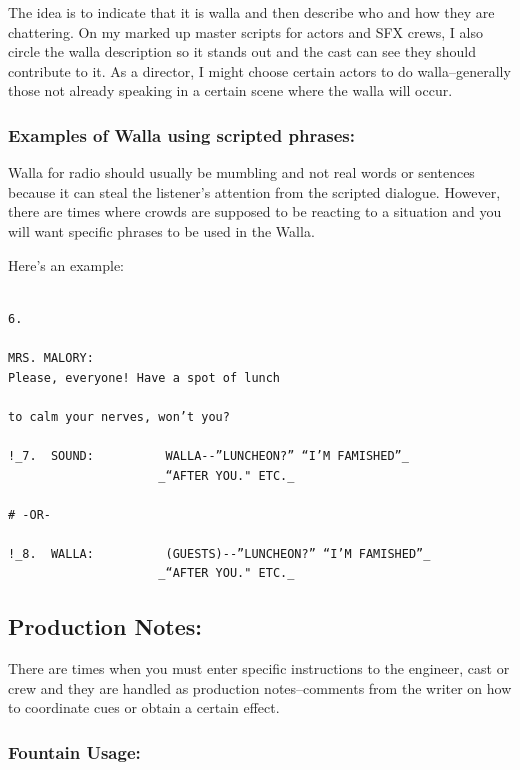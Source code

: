 \documentclass[openleft,oneside,showtrims]{memoir}
\begin{document}
The idea is to indicate that it is walla and then describe who and how they are chattering. On my marked up master scripts for actors and SFX crews, I also circle the walla description so it stands out and the cast can see they should contribute to it. As a director, I might choose certain actors to do walla--generally those not already speaking in a certain scene where the walla will occur.

\subsubsection*{Examples of Walla using scripted phrases:}
\label{sec:orgef529ac}

Walla for radio should usually be mumbling and not real words or sentences because it can steal the listener's attention from the scripted dialogue. However, there are times where crowds are supposed to be reacting to a situation and you will want specific phrases to be used in the Walla. 

Here's an example:

\lstset{language=fountain,label= ,caption= ,captionpos=b,numbers=none}
\begin{lstlisting}

6.

MRS. MALORY:
Please, everyone! Have a spot of lunch
  
to calm your nerves, won’t you?

!_7.  SOUND:          WALLA--”LUNCHEON?” “I’M FAMISHED”_
                     _“AFTER YOU." ETC._

# -OR-

!_8.  WALLA:          (GUESTS)--”LUNCHEON?” “I’M FAMISHED”_
                     _“AFTER YOU." ETC._

\end{lstlisting}
\subsection{Production Notes:}
\label{sec:orge362baf}
There are times when you must enter specific instructions to the engineer, cast or crew and they are handled as production notes--comments from the writer on how to coordinate cues or obtain a certain effect.

\subsubsection*{Fountain Usage:}
\label{sec:org80d9975}
\end{document}
